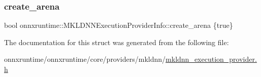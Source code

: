 \subsubsection{\texorpdfstring{create\+\_\+arena}{create\_arena}}
{\footnotesize\ttfamily bool onnxruntime\+::\+M\+K\+L\+D\+N\+N\+Execution\+Provider\+Info\+::create\+\_\+arena \{true\}}



The documentation for this struct was generated from the following file\+:\begin{DoxyCompactItemize}
\item 
onnxruntime/onnxruntime/core/providers/mkldnn/\mbox{\hyperlink{mkldnn__execution__provider_8h}{mkldnn\+\_\+execution\+\_\+provider.\+h}}\end{DoxyCompactItemize}
